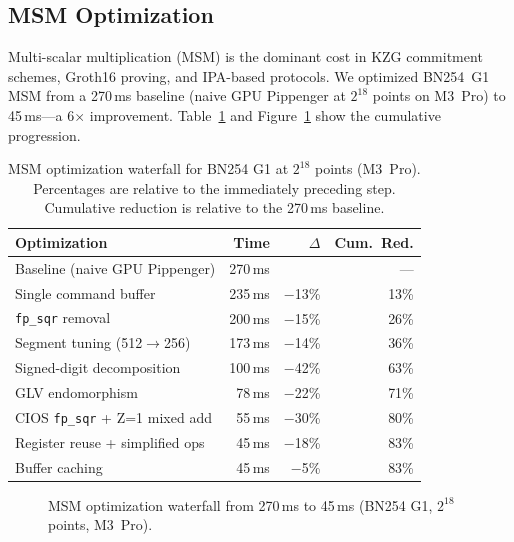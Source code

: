 \subsection{MSM Optimization}
\label{sec:msm-opt}

Multi-scalar multiplication (MSM) is the dominant cost in KZG commitment
schemes, Groth16 proving, and IPA-based protocols. We optimized BN254~G1 MSM
from a 270\,ms baseline (naive GPU Pippenger at $2^{18}$ points on M3~Pro) to
45\,ms---a 6$\times$ improvement. Table~\ref{tab:msm-waterfall} and
Figure~\ref{fig:msm-waterfall} show the cumulative progression.

\begin{table}[t]
\centering
\small
\begin{tabular}{lrrr}
\toprule
\textbf{Optimization} & \textbf{Time} & \textbf{$\Delta$} & \textbf{Cum.\ Red.} \\
\midrule
Baseline (naive GPU Pippenger)  & 270\,ms &       & --- \\
Single command buffer           & 235\,ms & $-$13\% & 13\% \\
\texttt{fp\_sqr} removal        & 200\,ms & $-$15\% & 26\% \\
Segment tuning (512$\to$256)    & 173\,ms & $-$14\% & 36\% \\
Signed-digit decomposition      & 100\,ms & $-$42\% & 63\% \\
GLV endomorphism                &  78\,ms & $-$22\% & 71\% \\
CIOS \texttt{fp\_sqr} + Z=1 mixed add & 55\,ms & $-$30\% & 80\% \\
Register reuse + simplified ops &  45\,ms & $-$18\% & 83\% \\
Buffer caching                  &  45\,ms & $-$5\%  & 83\% \\
\bottomrule
\end{tabular}
\caption{MSM optimization waterfall for BN254 G1 at $2^{18}$ points (M3~Pro).
  Percentages are relative to the immediately preceding step. Cumulative
  reduction is relative to the 270\,ms baseline.}
\label{tab:msm-waterfall}
\end{table}

\begin{figure}[t]
\centering
{}
\caption{MSM optimization waterfall from 270\,ms to 45\,ms (BN254 G1,
  $2^{18}$ points, M3~Pro).}
\label{fig:msm-waterfall}
\end{figure}

